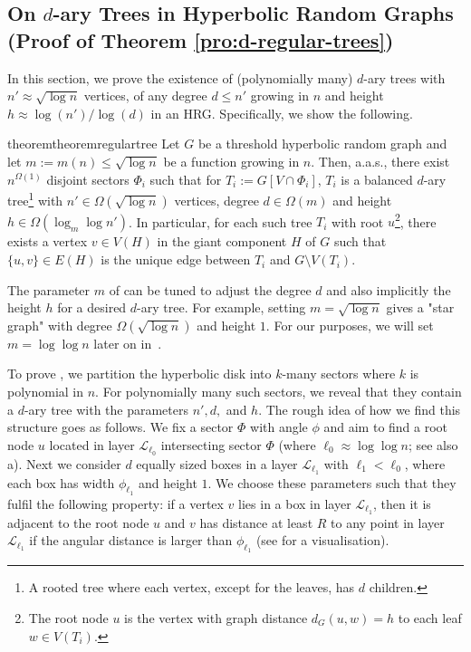 \documentclass[letterpaper,11pt]{article}
\newcommand{\aas}{a.a.s.\xspace}
\newcommand{\1}{\mathbb I}
\newcommand{\Layer}[1]{\mathcal{L}_{#1}}
\begin{document}
\subsection{On \texorpdfstring{$d$}{d}-ary Trees in Hyperbolic Random Graphs (Proof of Theorem \ref{pro:d-regular-trees})} \label{sec:d-regular-trees}
%
In this section, we prove the existence of (polynomially many) $d$-ary trees with $n' \approx \sqrt{\log n}$ vertices, of any degree $d  \leq n'$ growing in $n$ and height $h \approx \log(n')/\log(d)$ in an HRG. Specifically, we show the following.
%
\begin{restatable}{theorem}{theoremregulartree}
\label{pro:d-regular-trees}
Let $G$ be a threshold hyperbolic random graph and let $m:= m(n) \leq \sqrt{\log n}$ be a function growing in $n$. Then, \aas, there exist $n^{\Omega(1)}$ disjoint sectors $\Phi_i$ such that for $T_i := G[V \cap \Phi_i]$, $T_i$ is a balanced $d$-ary tree\footnote{A rooted tree where each vertex, except for the leaves, has $d$ children.} with $n' \in \Omega(\sqrt{\log n})$ vertices, degree $d \in \Omega(m)$ and height $h \in \Omega(\log_m\log n')$. In particular, for each such tree $T_i$ with root $u$\footnote{The root node $u$ is the vertex with graph distance $d_G(u,w) = h$ to each leaf $w \in V(T_i)$.}, there exists a vertex $v \in V(H)$ in the giant component $H$ of $G$ such that $\{u,v\} \in E(H)$ is the unique edge between $T_i$ and $G \setminus V(T_i)$.
\end{restatable}
%
The parameter $m$ of  can be tuned to adjust the degree $d$ and also implicitly the height $h$ for a desired $d$-ary tree. For example, setting $m = \sqrt{\log n}$ gives a "star graph" with degree $\Omega(\sqrt{\log n})$ and height $1$. For our purposes, we will set $m = \log\log n$ later on in~. 

To prove , we partition the hyperbolic disk into $k$-many sectors where $k$ is polynomial in $n$. For polynomially many such sectors, we reveal that they contain a $d$-ary tree with the parameters $n', d,$ and $h$. The rough idea of how we find this structure goes as follows. We fix a sector $\Phi$ with angle $\phi$ and aim to find a root node $u$ located in layer $\Layer{\ell_0}$ intersecting sector $\Phi$ (where $\ell_0 \approx \log\log n$; see also a). Next we consider $d$ equally sized boxes in a layer $\Layer{\ell_1}$ with $\ell_1 < \ell_0$, where each box has width $\phi_{\ell_1}$ and height $1$. We choose these parameters such that they fulfil the following property: if a vertex $v$ lies in a box in layer $\Layer{\ell_1}$, then it is adjacent to the root node $u$ and $v$ has distance at least $R$ to any point in layer $\Layer{\ell_1}$ if the angular distance is larger than $\phi_{\ell_1}$ (see  for a visualisation). 
\end{document}
